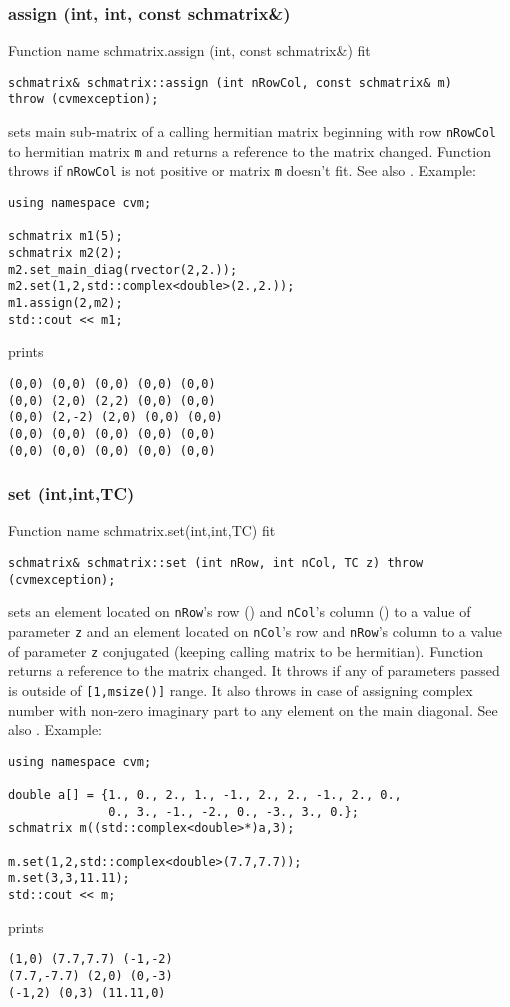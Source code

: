 \subsubsection{assign (int, int, const schmatrix\&)}
Function%
\pdfdest name {schmatrix.assign (int, const schmatrix&)} fit
\begin{verbatim}
schmatrix& schmatrix::assign (int nRowCol, const schmatrix& m)
throw (cvmexception);
\end{verbatim}
sets main sub-matrix of a calling hermitian matrix beginning with \Based row
\verb"nRowCol" to  hermitian matrix \verb"m" and
returns a reference to the matrix changed.
Function throws 
  if \verb"nRowCol"
is not positive or matrix \verb"m" doesn't fit.
See also .
Example:
\begin{Verbatim}
using namespace cvm;

schmatrix m1(5);
schmatrix m2(2);
m2.set_main_diag(rvector(2,2.));
m2.set(1,2,std::complex<double>(2.,2.));
m1.assign(2,m2);
std::cout << m1;
\end{Verbatim}
prints
\begin{Verbatim}
(0,0) (0,0) (0,0) (0,0) (0,0)
(0,0) (2,0) (2,2) (0,0) (0,0)
(0,0) (2,-2) (2,0) (0,0) (0,0)
(0,0) (0,0) (0,0) (0,0) (0,0)
(0,0) (0,0) (0,0) (0,0) (0,0)
\end{Verbatim}
\newpage



\subsubsection{set (int,int,TC)}
Function%
\pdfdest name {schmatrix.set(int,int,TC)} fit
\begin{verbatim}
schmatrix& schmatrix::set (int nRow, int nCol, TC z) throw (cvmexception);
\end{verbatim}
sets an element located on \verb"nRow"'s row (\Based)
and \verb"nCol"'s column (\Based) to a value of
parameter \verb"z" and
an element located
on \verb"nCol"'s row
and \verb"nRow"'s column to a value of
parameter \verb"z" conjugated (keeping
 calling matrix to be hermitian).
Function returns a reference to
the matrix changed.
It throws 
if any of parameters passed
is outside of \verb"[1,msize()]" range.
It also throws in case of assigning
complex number with non-zero imaginary part
to any element on the main diagonal.
See also .
Example:
\begin{Verbatim}
using namespace cvm;

double a[] = {1., 0., 2., 1., -1., 2., 2., -1., 2., 0.,
              0., 3., -1., -2., 0., -3., 3., 0.};
schmatrix m((std::complex<double>*)a,3);

m.set(1,2,std::complex<double>(7.7,7.7));
m.set(3,3,11.11);
std::cout << m;
\end{Verbatim}
prints
\begin{Verbatim}
(1,0) (7.7,7.7) (-1,-2)
(7.7,-7.7) (2,0) (0,-3)
(-1,2) (0,3) (11.11,0)
\end{Verbatim}
\newpage



